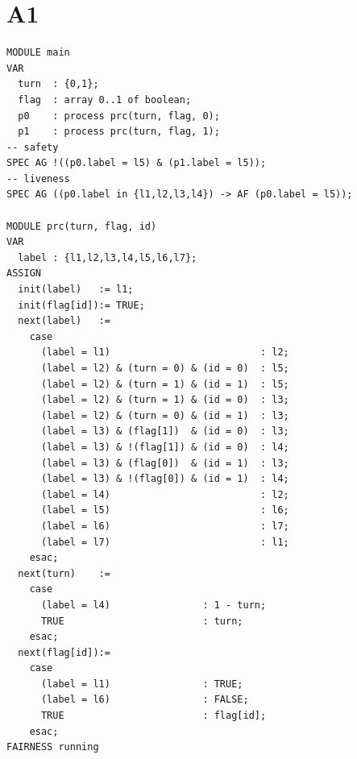 \documentclass[12pt]{article}
\begin{document}
\section*{A1}
\begin{verbatim}
MODULE main
VAR
  turn  : {0,1};
  flag  : array 0..1 of boolean;
  p0    : process prc(turn, flag, 0);
  p1    : process prc(turn, flag, 1);
-- safety
SPEC AG !((p0.label = l5) & (p1.label = l5));
-- liveness
SPEC AG ((p0.label in {l1,l2,l3,l4}) -> AF (p0.label = l5));

MODULE prc(turn, flag, id)
VAR
  label : {l1,l2,l3,l4,l5,l6,l7};
ASSIGN
  init(label)   := l1;
  init(flag[id]):= TRUE;
  next(label)   :=
    case
      (label = l1)                          : l2;
      (label = l2) & (turn = 0) & (id = 0)  : l5;
      (label = l2) & (turn = 1) & (id = 1)  : l5;
      (label = l2) & (turn = 1) & (id = 0)  : l3;
      (label = l2) & (turn = 0) & (id = 1)  : l3;
      (label = l3) & (flag[1])  & (id = 0)  : l3;
      (label = l3) & !(flag[1]) & (id = 0)  : l4;
      (label = l3) & (flag[0])  & (id = 1)  : l3;
      (label = l3) & !(flag[0]) & (id = 1)  : l4;
      (label = l4)                          : l2;
      (label = l5)                          : l6;
      (label = l6)                          : l7;
      (label = l7)                          : l1;
    esac;
  next(turn)    :=
    case
      (label = l4)                : 1 - turn;
      TRUE                        : turn;
    esac;
  next(flag[id]):=
    case
      (label = l1)                : TRUE;
      (label = l6)                : FALSE; 
      TRUE                        : flag[id];
    esac;
FAIRNESS running
\end{verbatim}

\newpage
\end{document}

